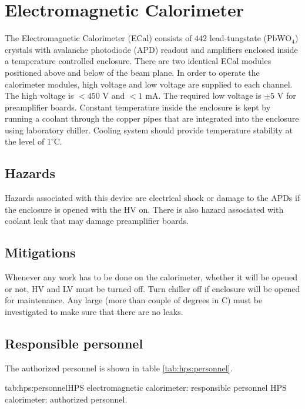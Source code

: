 
\section{Electromagnetic Calorimeter}
\indent

The Electromagnetic Calorimeter (ECal) consists of $442$ lead-tungstate (PbWO$_4$) crystals with avalanche photodiode (APD) 
readout and amplifiers enclosed inside a temperature controlled enclosure. There are two identical ECal modules positioned above and below of the beam plane. In order to operate the calorimeter modules,  high voltage and low voltage are supplied to each channel. The high voltage is $<450$ V and $<1$ mA. The required low voltage is $\pm 5$ V for preamplifier boards. Constant temperature inside the enclosure is kept by running a coolant through the copper pipes that are integrated into the enclosure using laboratory chiller. Cooling system should provide temperature stability at the level of $1^\circ$C.

\subsection{Hazards} 
\indent

Hazards associated with this device are electrical shock or damage to the APDs if the enclosure is opened with the  HV on. There is also hazard associated with coolant leak that may damage preamplifier boards.

\subsection{Mitigations}
\indent

Whenever any work has to be done on the calorimeter,  whether it will be opened or not, HV and LV must be turned off. Turn chiller off if enclosure will be opened for maintenance. Any large (more than couple of degrees in C) must be investigated to make sure that there are no leaks.   



\begin{safetyen}{10}{15}
\subsection{Responsible  personnel} 
\end{safetyen}
The authorized personnel is shown in table \ref{tab:hps:personnel}.
\begin{namestab}{tab:hps:personnel}{HPS  electromagnetic calorimeter: responsible personnel}{%
      HPS calorimeter: authorized personnel.}
\end{namestab}


